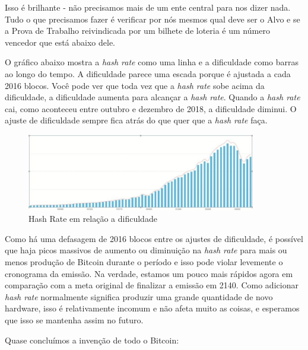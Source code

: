 Isso é brilhante - não precisamos mais de um ente central para nos dizer nada. Tudo o que precisamos fazer é verificar por nós mesmos qual deve ser o Alvo e se a Prova de Trabalho reivindicada por um bilhete de loteria é um número vencedor que está abaixo dele.

O gráfico abaixo mostra a \textit{hash rate} como uma linha e a dificuldade como barras ao longo do tempo. A dificuldade parece uma escada porque é ajustada a cada 2016 blocos. Você pode ver que toda vez que a \textit{hash rate} sobe acima da dificuldade, a dificuldade aumenta para alcançar a \textit{hash rate}. Quando a \textit{hash rate} cai, como aconteceu entre outubro e dezembro de 2018, a dificuldade diminui. O ajuste de dificuldade sempre fica atrás do que quer que a \textit{hash rate} faça.

\begin{figure}
  \centering
  \includegraphics[width=10cm]{imagens/grafico3-capitulo-05.jpg}
  \caption{Hash Rate em relação a dificuldade}
\end{figure}

Como há uma defasagem de 2016 blocos entre os ajustes de dificuldade, é possível que haja picos massivos de aumento ou diminuição na \textit{hash rate} para mais ou menos produção de Bitcoin durante o período e isso pode violar levemente o cronograma da emissão. Na verdade, estamos um pouco mais rápidos agora em comparação com a meta original de finalizar a emissão em 2140. Como adicionar \textit{hash rate} normalmente significa produzir uma grande quantidade de novo hardware, isso é relativamente incomum e não afeta muito as coisas, e esperamos que isso se mantenha assim no futuro.

Quase concluímos a invenção de todo o Bitcoin:

